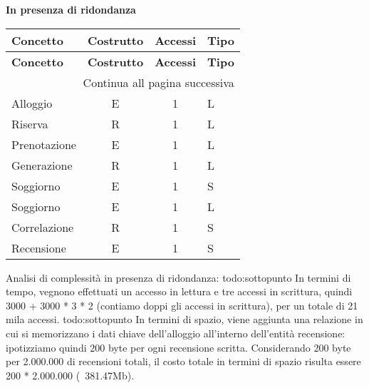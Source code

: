 \bf In presenza di ridondanza
\small
\setlength\extrarowheight{2pt}
\begin{longtable}{|l|c|c|p{6.2cm}|}
    \hline \textbf{Concetto} & \textbf{Costrutto} & \textbf{Accessi} & \textbf{Tipo}                                                                                                                         \\\hline
    \endfirsthead

    \hline \textbf{Concetto} & \textbf{Costrutto} & \textbf{Accessi} & \textbf{Tipo}                                                                                                                         \\\hline
    \endhead

    \hline \multicolumn{4}{|r|}{{Continua all pagina successiva}}                                                                                                                                             \\\hline
    \endfoot

    \hline
    \endlastfoot
    Alloggio                    & E             & 1        & L     \\\hline
    Riserva                     & R             & 1        & L     \\\hline
    Prenotazione                & E             & 1        & L     \\\hline
    Generazione                 & R             & 1        & L     \\\hline
    Soggiorno                   & E             & 1        & S     \\\hline
    Soggiorno                   & E             & 1        & L     \\\hline
    Correlazione                & R             & 1        & S     \\\hline
    Recensione                  & E             & 1        & S     \\\hline
\end{longtable}
\normalsize

Analisi di complessità in presenza di ridondanza:
{todo:sottopunto} In termini di tempo, vegnono effettuati un accesso in lettura e tre accessi in scrittura, quindi 3000 + 3000 * 3 * 2 (contiamo doppi gli accessi in scrittura), per un totale di 21 mila accessi.
{todo:sottopunto} In termini di spazio, viene aggiunta una relazione in cui si memorizzano i dati chiave dell'alloggio all'interno dell'entità recensione: ipotizziamo quindi 200 byte per ogni recensione scritta.
Considerando 200 byte per 2.000.000 di recensioni totali, il costo totale in termini di spazio risulta essere 200 * 2.000.000 (~381.47Mb).


